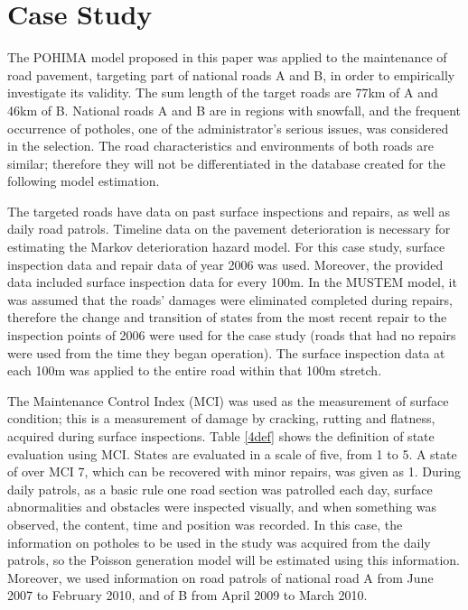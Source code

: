 \documentclass[Journal]{ascelike}
\begin{document}
\section{Case Study}\label{casestudy}
The POHIMA model proposed in this paper was applied to the maintenance of road pavement, targeting part of national roads A and B, in order to empirically investigate its validity. The sum length of the target roads are 77km of A and 46km of B. National roads A and B are in regions with snowfall, and the frequent occurrence of potholes, one of the administrator's serious issues, was considered in the selection. The road characteristics and environments of both roads are similar; therefore they will not be differentiated in the database created for the following model estimation.

The targeted roads have data on past surface inspections and repairs, as well as daily road patrols. Timeline data on the pavement deterioration is necessary for estimating the Markov deterioration hazard model. For this case study, surface inspection data and repair data of year 2006 was used. Moreover, the provided data included surface inspection data for every 100m. In the MUSTEM model, it was assumed that the roads' damages were eliminated completed during repairs, therefore the change and transition of states from the most recent repair to the inspection points of 2006 were used for the case study (roads that had no repairs were used from the time they began operation). The surface inspection data at each 100m was applied to the entire road within that 100m stretch. 

The Maintenance Control Index (MCI) was used as the measurement of surface condition; this is a measurement of damage by cracking, rutting and flatness, acquired during surface inspections. Table \ref{4def} shows the definition of state evaluation using MCI. States are evaluated in a scale of five, from 1 to 5. A state of over MCI 7, which can be recovered with minor repairs, was given as 1. During daily patrols, as a basic rule one road section was patrolled each day, surface abnormalities and obstacles were inspected visually, and when something was observed, the content, time and position was recorded. In this case, the information on potholes to be used in the study was acquired from the daily patrols, so the Poisson generation model will be estimated using this information. Moreover, we used information on road patrols of national road A from June 2007 to February 2010, and of B from April 2009 to March 2010.
\end{document}
